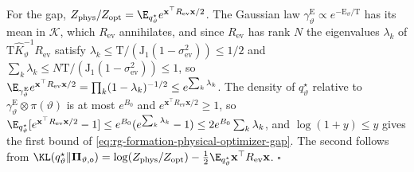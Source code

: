 For the gap, \(Z_{\mathrm{phys}}/Z_{\mathrm{opt}}=
\E_{q^\star_\vartheta}e^{\mathbf x^\top R_{\mathrm{ev}}\mathbf x/2}\). The
Gaussian law \(\gamma^{\mathrm E}_\vartheta\propto e^{-\mathrm E_\vartheta/\mathrm T}\)
has its mean in \(\mathcal K\), which \(R_{\mathrm{ev}}\) annihilates, and since
\(R_{\mathrm{ev}}\) has rank \(N\) the eigenvalues \(\lambda_k\) of
\(\mathrm T\widehat K_\vartheta^{-1}R_{\mathrm{ev}}\) satisfy
\(\lambda_k\le\mathrm T/(\mathrm J_1(1-\sigma^2_{\mathrm{ev}}))\le1/2\) and
\(\sum_k\lambda_k\le N\mathrm T/(\mathrm J_1(1-\sigma^2_{\mathrm{ev}}))\le1\), so
\(\E_{\gamma^{\mathrm E}_\vartheta}e^{\mathbf x^\top R_{\mathrm{ev}}\mathbf x/2}
=\prod_k(1-\lambda_k)^{-1/2}\le e^{\sum_k\lambda_k}\). The density of
\(q^\star_\vartheta\) relative to \(\gamma^{\mathrm E}_\vartheta\otimes\pi(\vartheta)\)
is at most \(e^{B_0}\) and \(e^{\mathbf x^\top R_{\mathrm{ev}}\mathbf x/2}\ge1\),
so \(\E_{q^\star_\vartheta}[e^{\mathbf x^\top R_{\mathrm{ev}}\mathbf x/2}-1]
\le e^{B_0}(e^{\sum_k\lambda_k}-1)\le2e^{B_0}\sum_k\lambda_k\), and
\(\log(1+y)\le y\) gives the first bound of
\cref{eq:rg-formation-physical-optimizer-gap}. The second follows from
\(\KL(q^\star_\vartheta\Vert\boldsymbol\Pi_{\vartheta,\mathsf o})
=\log(Z_{\mathrm{phys}}/Z_{\mathrm{opt}})
-\tfrac12\E_{q^\star_\vartheta}\mathbf x^\top R_{\mathrm{ev}}\mathbf x\).
\(\square\)

